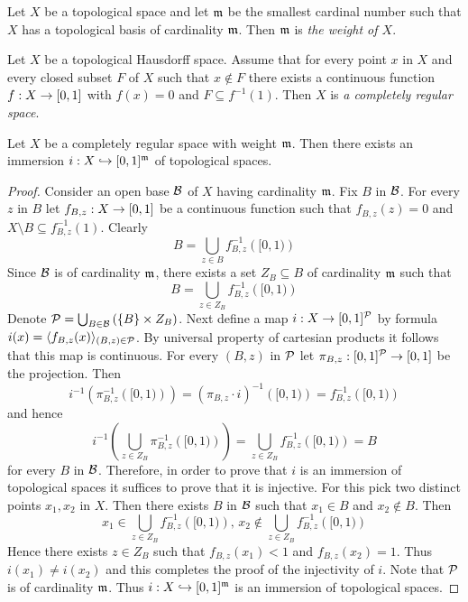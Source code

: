 \begin{definition}
Let $X$ be a topological space and let $\mathfrak{m}$ be the smallest cardinal number such that $X$ has a topological basis of cardinality $\mathfrak{m}$. Then $\mathfrak{m}$ is \textit{the weight of $X$}.
\end{definition}

\begin{definition}
Let $X$ be a topological Hausdorff space. Assume that for every point $x$ in $X$ and every closed subset $F$ of $X$ such that $x\not \in F$ there exists a continuous function $f:X\rightarrow [0,1]$ with $f(x) = 0$ and $F\subseteq f^{-1}(1)$. Then $X$ is \textit{a completely regular space}.
\end{definition}

\begin{theorem}[Tychonoff]\label{theorem:tychonoff_theorem_on_cube_embeddings}
Let $X$ be a completely regular space with weight $\mathfrak{m}$. Then there exists an immersion $i:X\hookrightarrow [0,1]^{\mathfrak{m}}$ of topological spaces.
\end{theorem}
\begin{proof}
Consider an open base ${\mathcal B}$ of $X$ having cardinality $\mathfrak{m}$. Fix $B$ in ${\mathcal B}$. For every $z$ in $B$ let $f_{B,z}:X\rightarrow [0,1]$ be a continuous function such that $f_{B,z}(z) = 0$ and $X\setminus B \subseteq f_{B,z}^{-1}(1)$. Clearly 
$$B = \bigcup_{z\in B}f_{B,z}^{-1}\left([0,1)\right)$$
Since ${\mathcal B}$ is of cardinality $\mathfrak{m}$, there exists a set $Z_B\subseteq B$ of cardinality $\mathfrak{m}$ such that
$$B = \bigcup_{z\in Z_B}f_{B,z}^{-1}\left([0,1)\right)$$
Denote ${\mathcal P} = \bigcup_{B\in {\mathcal B}}\left(\{B\}\times Z_B\right)$. Next define a map $i:X\rightarrow [0,1]^{{\mathcal P}}$ by formula $i(x)= \langle f_{B,z}(x)\rangle_{(B,z)\in {\mathcal P}}$. By universal property of cartesian products it follows that this map is continuous.
For every $(B,z)$ in ${\mathcal P}$ let $\pi_{B,z}:[0,1]^{{\mathcal P}}\rightarrow [0,1]$ be the projection. Then
$$i^{-1}\left(\pi_{B,z}^{-1}\left([0,1)\right)\right) = \left(\pi_{B,z}\cdot i\right)^{-1}\left([0,1)\right) = f_{B,z}^{-1}\left([0,1)\right)$$
and hence
$$i^{-1}\left(\bigcup_{z\in Z_B}\pi_{B,z}^{-1}\left([0,1)\right)\right) = \bigcup_{z\in Z_B} f_{B,z}^{-1}\left([0,1)\right) = B$$
for every $B$ in ${\mathcal B}$. Therefore, in order to prove that $i$ is an immersion of topological spaces it suffices to prove that it is injective. For this pick two distinct points $x_1,x_2$ in $X$. Then there exists $B$ in ${\mathcal B}$ such that $x_1 \in B$ and $x_2\not \in B$. Then 
$$x_1 \in \bigcup_{z\in Z_B} f_{B,z}^{-1}\left([0,1)\right),\,x_2\not \in \bigcup_{z\in Z_B} f_{B,z}^{-1}\left([0,1)\right)$$
Hence there exists $z \in Z_B$ such that $f_{B,z}(x_1) < 1$ and $f_{B,z}(x_2) = 1$. Thus $i(x_1) \neq i(x_2)$ and this completes the proof of the injectivity of $i$. Note that ${\mathcal P}$ is of cardinality $\mathfrak{m}$. Thus $i:X\hookrightarrow [0,1]^{\mathfrak{m}}$ is an immersion of topological spaces.
\end{proof}

